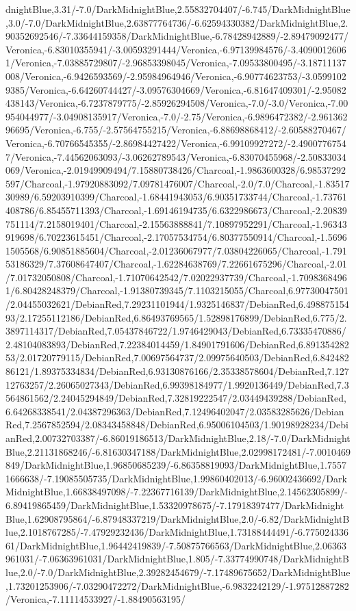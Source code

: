 {\begin{tikzternal}
dnightBlue,3.31/-7.0/DarkMidnightBlue,2.55832704407/-6.745/DarkMidnightBlue,3.0/-7.0/DarkMidnightBlue,2.63877764736/-6.62594330382/DarkMidnightBlue,2.90352692546/-7.33644159358/DarkMidnightBlue,-6.78428942889/-2.89479092477/Veronica,-6.83010355941/-3.00593291444/Veronica,-6.97139984576/-3.40900126061/Veronica,-7.03885729807/-2.96853398045/Veronica,-7.09533800495/-3.18711137008/Veronica,-6.9426593569/-2.95984964946/Veronica,-6.90774623753/-3.05991029385/Veronica,-6.64260744427/-3.09576304669/Veronica,-6.81647409301/-2.95082438143/Veronica,-6.7237879775/-2.85926294508/Veronica,-7.0/-3.0/Veronica,-7.00954044977/-3.04908135917/Veronica,-7.0/-2.75/Veronica,-6.9896472382/-2.96136296695/Veronica,-6.755/-2.57564755215/Veronica,-6.88698868412/-2.60588270467/Veronica,-6.70766545355/-2.86984427422/Veronica,-6.99109927272/-2.49007767547/Veronica,-7.44562063093/-3.06262789543/Veronica,-6.83070455968/-2.50833034069/Veronica,-2.01949909494/7.15880738426/Charcoal,-1.9863600328/6.98537292597/Charcoal,-1.97920883092/7.09781476007/Charcoal,-2.0/7.0/Charcoal,-1.8351730989/6.59203910399/Charcoal,-1.68441943053/6.90351733744/Charcoal,-1.73761408786/6.85455711393/Charcoal,-1.69146194735/6.6322986673/Charcoal,-2.20839751114/7.2158019401/Charcoal,-2.15563888841/7.10897952291/Charcoal,-1.96343919698/6.70223615451/Charcoal,-2.17057534754/6.80377550914/Charcoal,-1.56961505568/6.90851885604/Charcoal,-2.01236067977/7.03804226065/Charcoal,-1.79153186329/7.37608647407/Charcoal,-1.62284638769/7.22661675296/Charcoal,-2.01/7.01732050808/Charcoal,-1.71070642542/7.02022937739/Charcoal,-1.70983684961/6.80428248379/Charcoal,-1.91380739345/7.1103215055/Charcoal,6.97730047501/2.04455032621/DebianRed,7.29231101944/1.9325146837/DebianRed,6.49887515493/2.17255112186/DebianRed,6.86493769565/1.52898176899/DebianRed,6.775/2.3897114317/DebianRed,7.05437846722/1.9746429043/DebianRed,6.73335470886/2.48104083893/DebianRed,7.22384014459/1.84901791606/DebianRed,6.89135428253/2.01720779115/DebianRed,7.00697564737/2.09975640503/DebianRed,6.84248286121/1.89375334834/DebianRed,6.93130876166/2.35338578604/DebianRed,7.12712763257/2.26065027343/DebianRed,6.99398184977/1.9920136449/DebianRed,7.3564861562/2.24045294849/DebianRed,7.32819222547/2.03449439288/DebianRed,6.64268338541/2.04387296363/DebianRed,7.12496402047/2.03583285626/DebianRed,7.2567852594/2.08343458848/DebianRed,6.95006104503/1.90198928234/DebianRed,2.00732703387/-6.86019186513/DarkMidnightBlue,2.18/-7.0/DarkMidnightBlue,2.21131868246/-6.81630347188/DarkMidnightBlue,2.02998172481/-7.0010469849/DarkMidnightBlue,1.96850685239/-6.86358819093/DarkMidnightBlue,1.75571666638/-7.19085505735/DarkMidnightBlue,1.99860402013/-6.96002436692/DarkMidnightBlue,1.66838497098/-7.22367716139/DarkMidnightBlue,2.14562305899/-6.89419865459/DarkMidnightBlue,1.53320978675/-7.17918397477/DarkMidnightBlue,1.62908795864/-6.87948337219/DarkMidnightBlue,2.0/-6.82/DarkMidnightBlue,2.1018767285/-7.47929232436/DarkMidnightBlue,1.73188444491/-6.77502433661/DarkMidnightBlue,1.96442419839/-7.50875766563/DarkMidnightBlue,2.06363961031/-7.06363961031/DarkMidnightBlue,1.805/-7.33774990748/DarkMidnightBlue,2.0/-7.0/DarkMidnightBlue,2.39282454679/-7.17489675652/DarkMidnightBlue,1.73201253906/-7.03290472272/DarkMidnightBlue,-6.9832242129/-1.97512887282/Veronica,-7.11114533927/-1.88490563195/
\end{tikzternal}}
